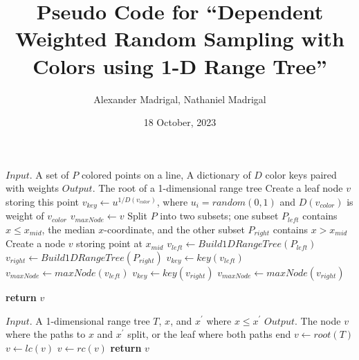 \documentclass{article}
\title{Pseudo Code for ``Dependent Weighted Random Sampling with Colors using 1-D Range Tree''}
\author{Alexander Madrigal, Nathaniel Madrigal}
\date{18 October, 2023}
\begin{document}
\maketitle

\begin{algorithm}
\caption{$Build1DRangeTree(P)$}
\begin{algorithmic}[1]
    \Statex $Input.$ A set of $P$ colored points on a line, A dictionary of $D$ color keys paired with \Statex \hspace{28 pt} weights
    \Statex $Output.$ The root of a 1-dimensional range tree
        \State Create a leaf node $v$ storing this point
        \State $v_{key} \gets u^{1/D(v_{color})}$, where $u_i = random(0,1)$ and $D(v_{color})$ is weight of \Statex \hspace{11.5 pt} $v_{color}$
        \State $v_{maxNode} \gets v$
    \Else 
        \State Split $P$ into two subsets; one subset $P_{left}$ contains $x \le x_{mid}$, the median \Statex \hspace{11.5 pt} $x$-coordinate, and the other subset $P_{right}$ contains $x > x_{mid}$
        \State Create a node $v$ storing point at $x_{mid}$
        \State $v_{left} \gets Build1DRangeTree(P_{left})$
        \State $v_{right} \gets Build1DRangeTree(P_{right})$
            \State $v_{key} \gets key(v_{left})$
            \State $v_{maxNode} \gets maxNode(v_{left})$ 
        \Else
            \State $v_{key} \gets key(v_{right})$
            \State $v_{maxNode} \gets maxNode(v_{right})$ 
            
        \EndIf
    \EndIf
    \State \textbf{return} $v$    
\end{algorithmic}
\end{algorithm}

\begin{algorithm}
\caption{$FindSplitNode(T, x, x^\prime)$}
\begin{algorithmic}[1]
    \Statex $Input.$ A 1-dimensional range tree $T$, $x$, and $x^\prime$ where $x \le x^\prime$
    \Statex $Output.$ The node $v$ where the paths to $x$ and $x^\prime$ split, or the leaf where both paths end
    \State $v \gets root(T)$
        \State $v \gets lc(v)$
        \Else 
        \State $v \gets rc(v)$
        \EndIf
    \EndWhile
    \State \textbf{return} $v$
\end{algorithmic}
\end{algorithm}
\end{document}
